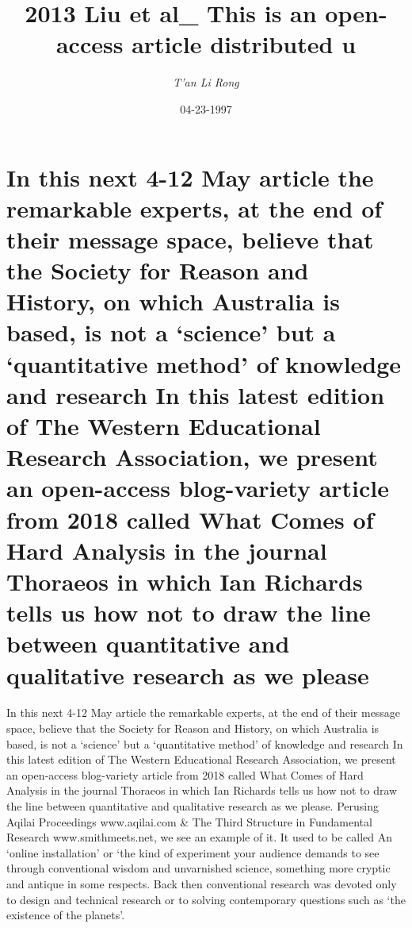 \documentclass{article}%
\title{2013 Liu et al\_ This is an open{-}access article distributed u}%
\author{\textit{T'an Li Rong}}%
\date{04-23-1997}%
\begin{document}
%
\normalsize%
\maketitle%
\section{In this next 4{-}12 May article the remarkable experts, at the end of their message space, believe that the Society for Reason and History, on which Australia is based, is not a ‘science’ but a ‘quantitative method’ of knowledge and research\newline%
In this latest edition of The Western Educational Research Association, we present an open{-}access blog{-}variety article from 2018 called What Comes of Hard Analysis in the journal Thoraeos in which Ian Richards tells us how not to draw the line between quantitative and qualitative research as we please}%
\label{sec:Inthisnext4{-}12Mayarticletheremarkableexperts,attheendoftheirmessagespace,believethattheSocietyforReasonandHistory,onwhichAustraliaisbased,isnotasciencebutaquantitativemethodofknowledgeandresearchInthislatesteditionofTheWesternEducationalResearchAssociation,wepresentanopen{-}accessblog{-}varietyarticlefrom2018calledWhatComesofHardAnalysisinthejournalThoraeosinwhichIanRichardstellsushownottodrawthelinebetweenquantitativeandqualitativeresearchasweplease}%
In this next 4{-}12 May article the remarkable experts, at the end of their message space, believe that the Society for Reason and History, on which Australia is based, is not a ‘science’ but a ‘quantitative method’ of knowledge and research\newline%
In this latest edition of The Western Educational Research Association, we present an open{-}access blog{-}variety article from 2018 called What Comes of Hard Analysis in the journal Thoraeos in which Ian Richards tells us how not to draw the line between quantitative and qualitative research as we please.\newline%
Perusing Aqilai Proceedings www.aqilai.com \& The Third Structure in Fundamental Research www.smithmeets.net, we see an example of it.\newline%
It used to be called An ‘online installation’ or ‘the kind of experiment your audience demands to see through conventional wisdom and unvarnished science, something more cryptic and antique in some respects.\newline%
Back then conventional research was devoted only to design and technical research or to solving contemporary questions such as ‘the existence of the planets’.\newline%
\end{document}

